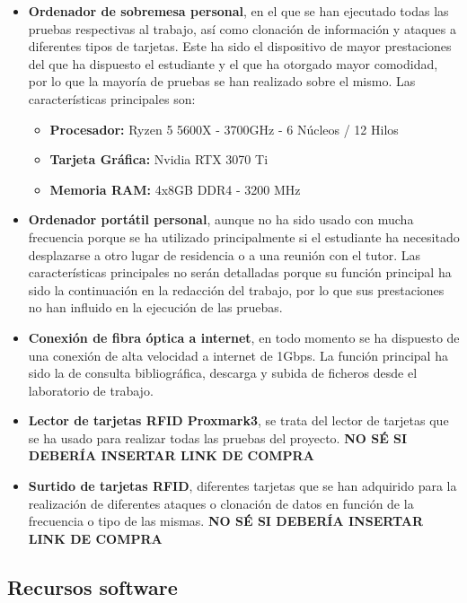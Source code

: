 \begin{itemize}
  \item \textbf{Ordenador de sobremesa personal}, en el que se han ejecutado todas las pruebas respectivas al trabajo,
    así como clonación de información y ataques a diferentes tipos de tarjetas. Este ha sido el dispositivo de mayor 
    prestaciones del que ha dispuesto el estudiante y el que ha otorgado mayor comodidad, por lo que la mayoría de 
    pruebas se han realizado sobre el mismo. Las características principales son:
    \begin{itemize}
        \item \textbf{Procesador: } Ryzen 5 5600X - 3700GHz - 6 Núcleos / 12 Hilos
        \item \textbf{Tarjeta Gráfica: } Nvidia RTX 3070 Ti
        \item \textbf{Memoria RAM: } 4x8GB DDR4 - 3200 MHz
    \end{itemize}
  \item \textbf{Ordenador portátil personal}, aunque no ha sido usado con mucha frecuencia porque se ha utilizado
    principalmente si el estudiante ha necesitado desplazarse a otro lugar de residencia o a una reunión con el tutor.
    Las características principales no serán detalladas porque su función principal ha sido la continuación en la 
    redacción del trabajo, por lo que sus prestaciones no han influido en la ejecución de las pruebas.
  \item \textbf{Conexión de fibra óptica a internet}, en todo momento se ha dispuesto de una conexión de alta velocidad
    a internet de 1Gbps. La función principal ha sido la de consulta bibliográfica, descarga y subida de ficheros desde
    el laboratorio de trabajo.
  \item \textbf{Lector de tarjetas RFID Proxmark3}, se trata del lector de tarjetas que se ha usado para realizar todas
    las pruebas del proyecto. \textbf{NO SÉ SI DEBERÍA INSERTAR LINK DE COMPRA}
  \item \textbf{Surtido de tarjetas RFID}, diferentes tarjetas que se han adquirido para la realización de 
    diferentes ataques o clonación de datos en función de la frecuencia o tipo de las mismas. 
    \textbf{NO SÉ SI DEBERÍA INSERTAR LINK DE COMPRA}
\end{itemize}

\subsection{Recursos software}

